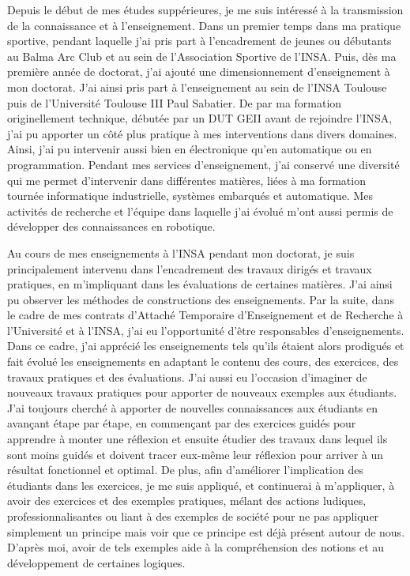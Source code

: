 \documentclass[11pt,a4paper,sans]{moderncv}         %
\begin{document}
Depuis le début de mes études suppérieures, je me suis intéressé à la transmission de la connaissance et à l'enseignement. Dans un premier temps dans ma pratique sportive, pendant laquelle j'ai pris part à l'encadrement de jeunes ou débutants au Balma Arc Club et au sein de l'Association Sportive de l'INSA. Puis, dès ma première année de doctorat, j'ai ajouté une dimensionnement d'enseignement à mon doctorat. J'ai ainsi pris part à l'enseignement au sein de l'INSA Toulouse puis de l'Université Toulouse III Paul Sabatier. De par ma formation originellement technique, débutée par un DUT GEII avant de rejoindre l'INSA, j'ai pu apporter un côté plus pratique à mes interventions dans divers domaines. Ainsi, j'ai pu intervenir aussi bien en électronique qu'en automatique ou en programmation. Pendant mes services d'enseignement, j'ai conservé une diversité qui me permet d'intervenir dans différentes matières, liées à ma formation tournée informatique industrielle, systèmes embarqués et automatique. Mes activités de recherche et l'équipe dans laquelle j'ai évolué m'ont aussi permis de développer des connaissances en robotique.

Au cours de mes enseignements à l'INSA pendant mon doctorat, je suis principalement intervenu dans l'encadrement des travaux dirigés et travaux pratiques, en m'impliquant dans les évaluations de certaines matières. J'ai ainsi pu observer les méthodes de constructions des enseignements. Par la suite, dans le cadre de mes contrats d'Attaché Temporaire d'Enseignement et de Recherche à l'Université et à l'INSA, j'ai eu l'opportunité d'être responsables d'enseignements. Dans ce cadre, j'ai apprécié les enseignements tels qu'ils étaient alors prodigués et fait évolué les enseignements en adaptant le contenu des cours, des exercices, des travaux pratiques et des évaluations. J'ai aussi eu l'occasion d'imaginer de nouveaux travaux pratiques pour apporter de nouveaux exemples aux étudiants. J'ai toujours cherché à apporter de nouvelles connaissances aux étudiants en avançant étape par étape, en commençant par des exercices guidés pour apprendre à monter une réflexion et ensuite étudier des travaux dans lequel ils sont moins guidés et doivent tracer eux-même leur réflexion pour arriver à un résultat fonctionnel et optimal. De plus, afin d'améliorer l'implication des étudiants dans les exercices, je me suis appliqué, et continuerai à m'appliquer, à avoir des exercices et des exemples pratiques, mélant des actions ludiques, professionnalisantes ou liant à des exemples de société pour ne pas appliquer simplement un principe mais voir que ce principe est déjà présent autour de nous. D'après moi, avoir de tels exemples aide à la compréhension des notions et au développement de certaines logiques.
\end{document}
